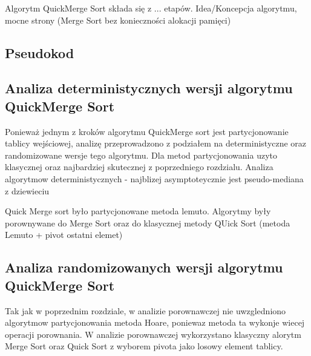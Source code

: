 Algorytm QuickMerge Sort składa się z ... etapów.
Idea/Koncepcja algorytmu, mocne strony (Merge Sort bez konieczności alokacji pamięci)

\subsection{Pseudokod}

\subsection{Analiza deterministycznych wersji algorytmu QuickMerge Sort}
Ponieważ jednym z kroków algorytmu QuickMerge sort jest partycjonowanie tablicy wejściowej, analizę przeprowadzono z podziałem na deterministyczne oraz randomizowane wersje tego algorytmu.
Dla metod partycjonowania uzyto klasycznej oraz najbardziej skutecznej z poprzedniego rozdzialu.
Analiza algorytmow deterministycznych - najblizej asymptoteycznie jest pseudo-mediana z dziewieciu

Quick Merge sort było partycjonowane metoda lemuto.
Algorytmy były porownywane do Merge Sort oraz do klasycznej metody QUick Sort (metoda Lemuto + pivot ostatni elemet)

\begin{figure}[]
	\centering
	
	\caption[]{}
	\label{fig:quick-merge-sort-deterministic-pivot-random}
\end{figure}

\begin{figure}[]
	\centering
	
	\caption[]{}
	\label{fig:quick-merge-sort-deterministic-pivot-cost-factor}
\end{figure}

\subsection{Analiza randomizowanych wersji algorytmu QuickMerge Sort}
Tak jak w poprzednim rozdziale, w analizie porownawczej nie uwzgledniono algorytmow partycjonowania metoda Hoare, poniewaz metoda ta wykonje wiecej operacji porownania.
W analizie porownawczej wykorzystano klasyczny alorytm Merge Sort oraz Quick Sort z wyborem pivota jako losowy element tablicy.

\begin{figure}[]
	\centering
	
	\caption[]{}
	\label{fig:quick-merge-sort-nondeterministic-pivot-random}
\end{figure}


